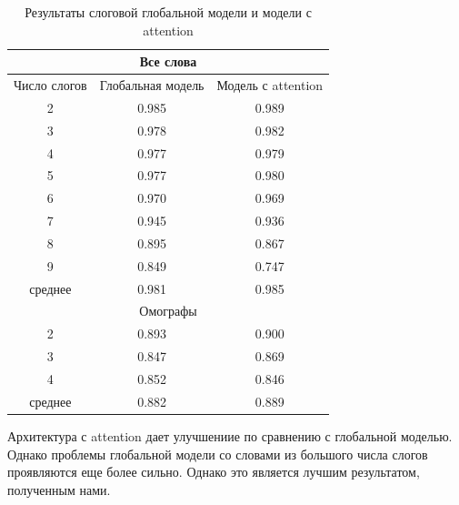 \documentclass[14pt, a4paper, russian]{extreport}
\begin{document}
\begin{table}[H]
	\caption{Результаты слоговой глобальной модели и модели с attention}
	
	\begin{small}
		\begin{center}
			\begin{tabular}{|c | c| c |}
				\hline
								\multicolumn{3}{|c|}{Все слова}                                       \\ \hline
				
				Число слогов & Глобальная модель & Модель с attention \\ \hline
				     2       & 0.985             & 0.989              \\ \hline
				     3       & 0.978             & 0.982              \\ \hline
				     4       & 0.977             & 0.979              \\ \hline
				     5       & 0.977             & 0.980              \\ \hline
				     6       & 0.970             & 0.969              \\ \hline
				     7       & 0.945             & 0.936              \\ \hline
				     8       & 0.895             & 0.867              \\ \hline
				     9       & 0.849             & 0.747              \\ \hline
				  среднее    & 0.981             & 0.985              \\ \hline
				  				\multicolumn{3}{|c|}{Омографы}                                       \\ \hline
				  
				     2       & 0.893             & 0.900              \\ \hline
				     3       & 0.847             & 0.869              \\ \hline
				     4       & 0.852             & 0.846              \\ \hline
				  среднее    & 0.882             & 0.889              \\ \hline
			\end{tabular}
		\end{center}
	\end{small}
	\label{table:global_att}
\end{table}



Архитектура с attention дает улучшениие по сравнению с глобальной моделью. Однако проблемы глобальной модели со словами из большого числа слогов проявляются еще более сильно. Однако это является лучшим результатом, полученным нами.
\end{document}
